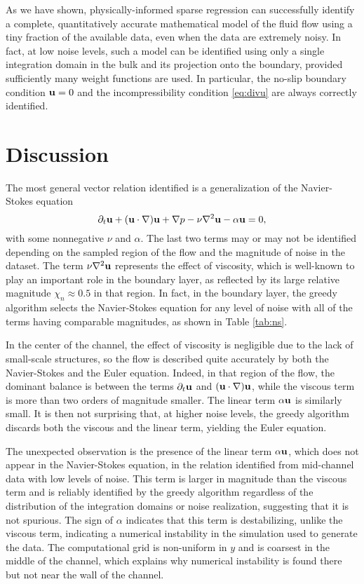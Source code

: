 \documentclass[9pt,twocolumn,twoside,lineno]{pnas-new}
\begin{document}
As we have shown, physically-informed sparse regression can successfully identify a complete, quantitatively accurate mathematical model of the fluid flow using a tiny fraction of the available data, even when the data are extremely noisy. In fact, at low noise levels, such a model can be identified using only a single integration domain in the bulk and its projection onto the boundary, provided sufficiently many weight functions are used. In particular, the no-slip boundary condition ${\bf u}=0$ and the incompressibility condition \eqref{eq:divu} are always correctly identified. 

\section*{Discussion}

The most general vector relation identified is a generalization of the Navier-Stokes equation
\begin{equation} \label{eq:unstable}
    \partial_t{\bf u}+({\bf u}\cdot\nabla){\bf u}+\nabla p-\nu\nabla^2{\bf u}-\alpha{\bf u}=0,
\end{equation}
with some nonnegative $\nu$ and $\alpha$. The last two terms may or may not be identified depending on the sampled region of the flow and the magnitude of noise in the dataset. The term $\nu\nabla^2{\bf u}$ represents the effect of viscosity, which is well-known to play an important role in the boundary layer, as reflected by its large relative magnitude ${\chi_n\approx 0.5}$ in that region. In fact, in the boundary layer, the greedy algorithm selects the Navier-Stokes equation for any level of noise with all of the terms having comparable magnitudes, as shown in Table \ref{tab:ns}. 

In the center of the channel, the effect of viscosity is negligible due to the lack of small-scale structures, so the flow is described quite accurately by both the Navier-Stokes and the Euler equation. Indeed, in that region of the flow, the dominant balance is between the terms $\partial_t{\bf u}$ and $({\bf u}\cdot\nabla){\bf u}$, while the viscous term is more than two orders of magnitude smaller. The linear term $\alpha{\bf u}$ is similarly small. It is then not surprising that, at higher noise levels, the greedy algorithm discards both the viscous and the linear term, yielding the Euler equation.

The unexpected observation is the presence of the linear term $\alpha{\bf u}$, which does not appear in the Navier-Stokes equation, in the relation identified from mid-channel data with low levels of noise. This term is larger in magnitude than the viscous term and is reliably identified by the greedy algorithm regardless of the distribution of the integration domains or noise realization, suggesting that it is not spurious. The sign of $\alpha$ indicates that this term is destabilizing, unlike the viscous term, indicating a numerical instability in the simulation used to generate the data. The computational grid is non-uniform in $y$ and is coarsest in the middle of the channel, which explains why numerical instability is found there but not near the wall of the channel.
\end{document}
